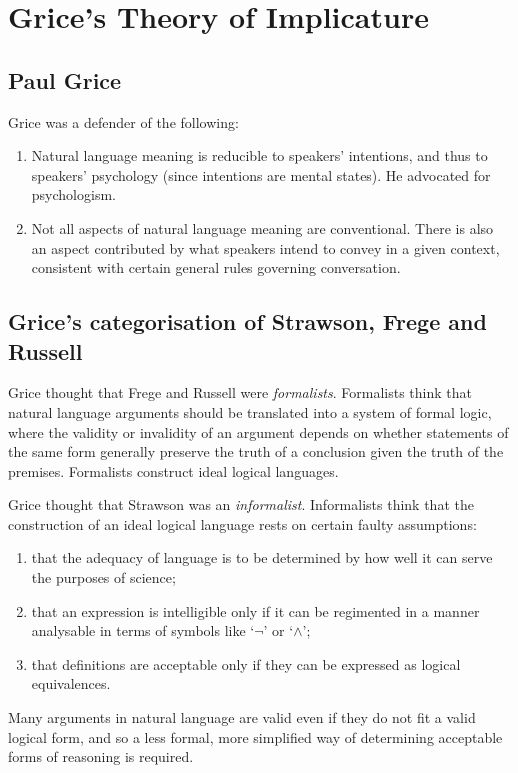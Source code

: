 \chapter{Grice's Theory of Implicature}

\section{Paul Grice}

Grice was a defender of the following:
\begin{enumerate}[label=\roman*.]
  \item Natural language meaning is reducible to speakers' intentions, and thus to speakers' psychology (since intentions are mental states). He advocated for psychologism.
  \item Not all aspects of natural language meaning are conventional. There is also an aspect contributed by what speakers intend to convey in a given context, consistent with certain general rules governing conversation.
\end{enumerate}

\section{Grice's categorisation of Strawson, Frege and Russell}

\begin{definition}[Formalists]
Grice thought that Frege and Russell were \emph{formalists}. Formalists think that natural language arguments should be translated into a system of formal logic, where the validity or invalidity of an argument depends on whether statements of the same form generally preserve the truth of a conclusion given the truth of the premises. Formalists construct ideal logical languages.
\end{definition}

\begin{definition}[Informalists]
Grice thought that Strawson was an \emph{informalist}. Informalists think that the construction of an ideal logical language rests on certain faulty assumptions:
\begin{enumerate}[label=\roman*)]
  \item that the adequacy of language is to be determined by how well it can serve the purposes of science;
  \item that an expression is intelligible only if it can be regimented in a manner analysable in terms of symbols like `$\neg$' or `$\wedge$';
  \item that definitions are acceptable only if they can be expressed as logical equivalences.
\end{enumerate}
Many arguments in natural language are valid even if they do not fit a valid logical form, and so a less formal, more simplified way of determining acceptable forms of reasoning is required.
\end{definition}

